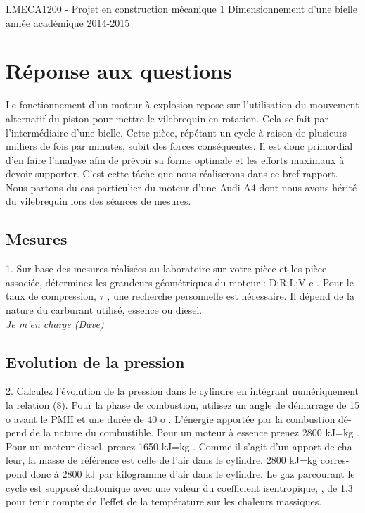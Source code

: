 \documentclass[a4paper,oneside,12pt]{report}
\begin{document}
\begin{titlepage}

LMECA1200 - Projet en construction mécanique 1
Dimensionnement d’une bielle
année académique 2014-2015

\end{titlepage}

\section{Réponse aux questions}

Le fonctionnement d'un moteur à explosion repose sur l'utilisation du mouvement alternatif du piston pour mettre le vilebrequin en rotation. Cela se fait par l'intermédiaire d'une bielle. Cette pièce, répétant un cycle à raison de plusieurs milliers de fois par minutes, subit des forces conséquentes. Il est donc primordial d'en faire l'analyse afin de prévoir sa forme optimale et les efforts maximaux à devoir supporter. C'est cette tâche que nous réaliserons dans ce bref rapport. Nous partons du cas particulier du moteur d'une Audi A4 dont nous avons hérité du vilebrequin lors des séances de mesures.

\subsection{Mesures}
1. Sur base des mesures réalisées au laboratoire sur votre pièce et les pièce associée,
déterminez les grandeurs géométriques du moteur :
D;R;L;V
c
. Pour le taux de
compression,
$\tau$
, une recherche personnelle est nécessaire. Il dépend de la nature
du carburant utilisé, essence ou diesel.\\

\textit{Je m'en charge (Dave)}

\subsection{Evolution de la pression}
2. Calculez l’évolution de la pression dans le cylindre en intégrant numériquement
la relation (8). Pour la phase de combustion, utilisez un angle de démarrage de
15
o
avant le PMH et une durée de
40
o
. L’énergie apportée par la combustion dé-
pend de la nature du combustible. Pour un moteur à essence prenez
2800
kJ=kg
.
Pour un moteur diesel, prenez
1650
kJ=kg
. Comme il s’agit d’un apport de cha-
leur, la masse de référence est celle de l’air dans le cylindre.
2800
kJ=kg
corres-
pond donc à
2800
kJ
par kilogramme d’air dans le cylindre. Le gaz parcourant
le cycle est supposé diatomique avec une valeur du coefficient isentropique,
,
de 1.3 pour tenir compte de l’effet de la température sur les chaleurs massiques.
\end{document}
